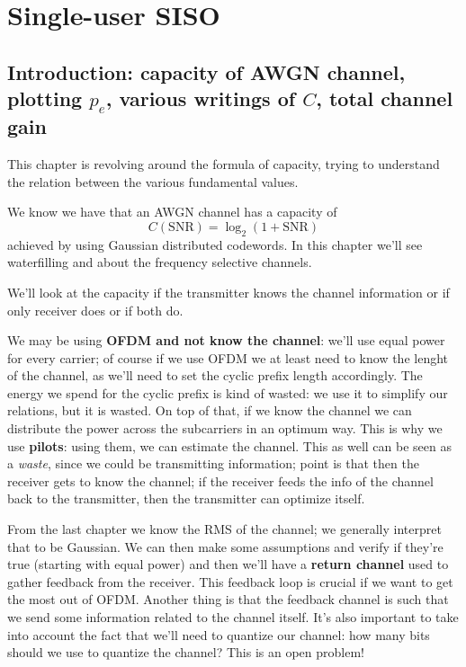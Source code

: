 \documentclass[a4paper, 12pt]{book}
\begin{document}
\newpage

\section{Single-user SISO}

\subsection{Introduction: capacity of AWGN channel, plotting $p_e$, various writings of $C$, total channel gain}

This chapter is revolving around the formula of capacity, trying to understand the relation between the various fundamental values.

We know we have that an AWGN channel has a capacity of
\[
C(\text{SNR}) = \log_2(1 + \text{SNR})
\]
achieved by using Gaussian distributed codewords.
In this chapter we'll see waterfilling and about the frequency selective channels.

We'll look at the capacity if the transmitter knows the channel information or if only receiver does or if both do.

We may be using \textbf{OFDM and not know the channel}: we'll use equal power for every carrier; of course if we use OFDM we at least need to know the lenght of the channel, as we'll need to set the cyclic prefix length accordingly. The energy we spend for the cyclic prefix is kind of wasted: we use it to simplify our relations, but it is wasted.
On top of that, if we know the channel we can distribute the power across the subcarriers in an optimum way. This is why we use \textbf{pilots}: using them, we can estimate the channel. This as well can be seen as a \textit{waste}, since we could be transmitting information; point is that then the receiver gets to know the channel; if the receiver feeds the info of the channel back to the transmitter, then the transmitter can optimize itself.

From the last chapter we know the RMS of the channel; we generally interpret that to be Gaussian. We can then make some assumptions and verify if they're true (starting with equal power) and then we'll have a \textbf{return channel} used to gather feedback from the receiver.
This feedback loop is crucial if we want to get the most out of OFDM. Another thing is that the feedback channel is such that we send some information related to the channel itself.
It's also important to take into account the fact that we'll need to quantize our channel: how many bits should we use to quantize the channel? This is an open problem!
\end{document}
